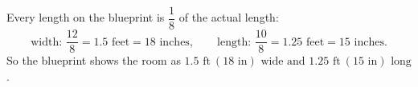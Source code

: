 Every length on the blueprint is $\dfrac18$ of the actual length:
\[\text{width: }\dfrac{12}{8}=1.5\text{ feet}=18\text{ inches},\qquad\text{length: }\dfrac{10}{8}=1.25\text{ feet}=15\text{ inches}.\]
So the blueprint shows the room as $\boxed{1.5\text{ ft}\ (18\text{ in})\text{ wide and }1.25\text{ ft}\ (15\text{ in})\text{ long}}$.
